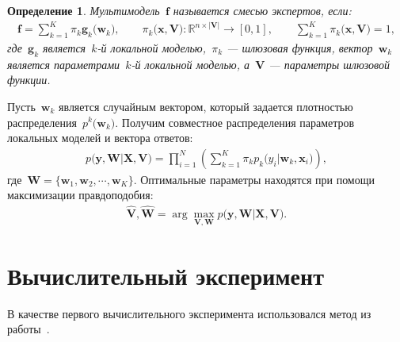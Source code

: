 \documentclass[12pt, twoside]{article}
\newtheorem{definition}{Определение}
\begin{document}
\begin{definition}
\label{def:2}
Мультимодель~$\mathbf{f}$ называется смесью экспертов, если:
\[
\label{eq:st:2}
\begin{aligned}
\mathbf{f} = \sum_{k=1}^{K}\pi_{k}\mathbf{g}_k\bigr(\mathbf{w}_k\bigr), \qquad \pi_{k}\bigr(\mathbf{x}, \mathbf{V}\bigr):\mathbb{R}^{n\times \left|\mathbf{V}\right|} \to [0, 1], \qquad \sum_{k=1}^{K}\pi_{k}\bigr(\mathbf{x}, \mathbf{V}\bigr) = 1,
\end{aligned}
\]
где~$\mathbf{g}_k$ является~$k$-й локальной моделью,~$\pi_k$ --- шлюзовая функция, вектор~$\mathbf{w}_k$ является параметрами~$k$-й локальной моделью, а~$\mathbf{V}$ --- параметры шлюзовой функции.
\end{definition}

Пусть~$\mathbf{w}_k$ является случайным вектором, который задается плотностью распределения~$p^{k}\bigr(\mathbf{w}_k\bigr)$. Получим совместное распределения параметров локальных моделей и вектора ответов:
\[
\label{eq:st:3}
\begin{aligned}
p\bigr(\mathbf{y}, \mathbf{W}|\mathbf{X}, \mathbf{V}\bigr) = \prod_{i=1}^{N}\left(\sum_{k=1}^{K}\pi_{k}p_{k}\bigr(y_i|\mathbf{w}_k, \mathbf{x}_i\bigr)\right),
\end{aligned}
\]
где~$\mathbf{W} = \bigr\{\mathbf{w}_1, \mathbf{w}_2, \cdots, \mathbf{w}_K\bigr\}.$
Оптимальные параметры находятся при помощи максимизации правдоподобия:
\[
\label{eq:st:4}
\begin{aligned}
\hat{\mathbf{V}}, \hat{ \mathbf{W}} = \arg\max_{\mathbf{V}, \mathbf{W}} p\bigr(\mathbf{y},  \mathbf{W}|\mathbf{X}, \mathbf{V}\bigr).
\end{aligned}
\]

\section{Вычислительный эксперимент}
В качестве первого вычислительного эксперимента использовался метод из работы~\cite{article5}.
\end{document}
